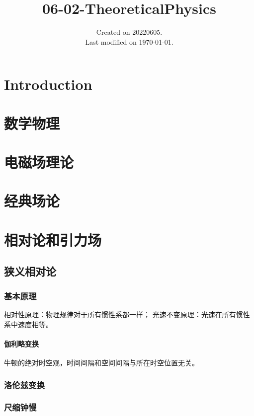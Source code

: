 \documentclass[UTF8]{../06-Physics}
\begin{document}
\title{06-02-TheoreticalPhysics}
\date{Created on 20220605.\\   Last modified on \today.}
\maketitle
\tableofcontents


\chapter{Introduction}


\chapter{数学物理}
\chapter{电磁场理论}
\chapter{经典场论}
\chapter{相对论和引力场}


\section{狭义相对论}

\subsection{基本原理}
相对性原理：物理规律对于所有惯性系都一样；
光速不变原理：光速在所有惯性系中速度相等。

\subsubsection{伽利略变换}
牛顿的绝对时空观，时间间隔和空间间隔与所在时空位置无关。


\subsection{洛伦兹变换}



\subsection{尺缩钟慢}
\end{document}
